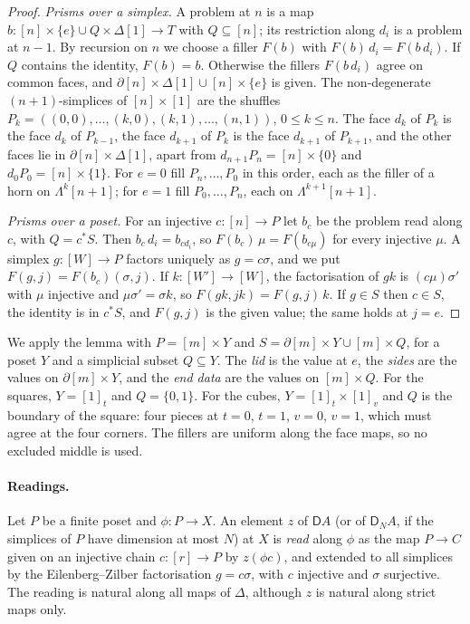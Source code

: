 \documentclass[11pt]{article}
\newcommand{\D}{\mathsf{D}}
\newcommand{\Lam}{\Lambda}
\theoremstyle{plain}
\theoremstyle{definition}
\theoremstyle{remark}
\begin{document}
\begin{proof}
\emph{Prisms over a simplex.} A problem at $n$ is a map
$b:[n]\times\{e\}\cup Q\times\Delta[1]\to T$ with $Q\subseteq[n]$; its
restriction along $d_i$ is a problem at $n-1$. By recursion on $n$ we
choose a filler $F(b)$ with $F(b)\,d_i=F(b\,d_i)$. If $Q$ contains the
identity, $F(b)=b$. Otherwise the fillers $F(b\,d_i)$ agree on common
faces, and $\partial[n]\times\Delta[1]\cup[n]\times\{e\}$ is given. The
non-degenerate $(n+1)$-simplices of $[n]\times[1]$ are the shuffles
$P_k=((0,0),\dots,(k,0),(k,1),\dots,(n,1))$, $0\le k\le n$. The face $d_k$
of $P_k$ is the face $d_k$ of $P_{k-1}$, the face $d_{k+1}$ of $P_k$ is the
face $d_{k+1}$ of $P_{k+1}$, and the other faces lie in
$\partial[n]\times\Delta[1]$, apart from $d_{n+1}P_n=[n]\times\{0\}$ and
$d_0P_0=[n]\times\{1\}$. For $e=0$ fill $P_n,\dots,P_0$ in this order, each
as the filler of a horn on $\Lam^k[n+1]$; for $e=1$ fill $P_0,\dots,P_n$,
each on $\Lam^{k+1}[n+1]$.

\emph{Prisms over a poset.} For an injective $c:[n]\to P$ let $b_c$ be the
problem read along $c$, with $Q=c^*S$. Then $b_c\,d_i=b_{cd_i}$, so
$F(b_c)\,\mu=F(b_{c\mu})$ for every injective $\mu$. A simplex $g:[W]\to P$
factors uniquely as $g=c\sigma$, and we put $F(g,j)=F(b_c)(\sigma,j)$. If
$k:[W']\to[W]$, the factorisation of $gk$ is $(c\mu)\sigma'$ with $\mu$
injective and $\mu\sigma'=\sigma k$, so $F(gk,jk)=F(g,j)\,k$. If $g\in S$
then $c\in S$, the identity is in $c^*S$, and $F(g,j)$ is the given value;
the same holds at $j=e$.
\end{proof}

We apply the lemma with $P=[m]\times Y$ and
$S=\partial[m]\times Y\cup[m]\times Q$, for a poset $Y$ and a simplicial
subset $Q\subseteq Y$. The \emph{lid} is the value at $e$, the \emph{sides}
are the values on $\partial[m]\times Y$, and the \emph{end data} are the
values on $[m]\times Q$. For the squares, $Y=[1]_t$ and $Q=\{0,1\}$. For the
cubes, $Y=[1]_t\times[1]_v$ and $Q$ is the boundary of the square: four
pieces at $t=0$, $t=1$, $v=0$, $v=1$, which must agree at the four corners.
The fillers are uniform along the face maps, so no excluded middle is used.

\paragraph{Readings.} Let $P$ be a finite poset and $\phi:P\to X$. An
element $z$ of $\D A$ (or of $\D_NA$, if the simplices of $P$ have
dimension at most $N$) at $X$ is \emph{read} along $\phi$ as the map
$P\to C$ given on an injective chain $c:[r]\to P$ by $z(\phi c)$, and
extended to all simplices by the Eilenberg--Zilber factorisation $g=c\sigma$,
with $c$ injective and $\sigma$ surjective. The reading is natural along
all maps of $\Delta$, although $z$ is natural along strict maps only.
\end{document}
